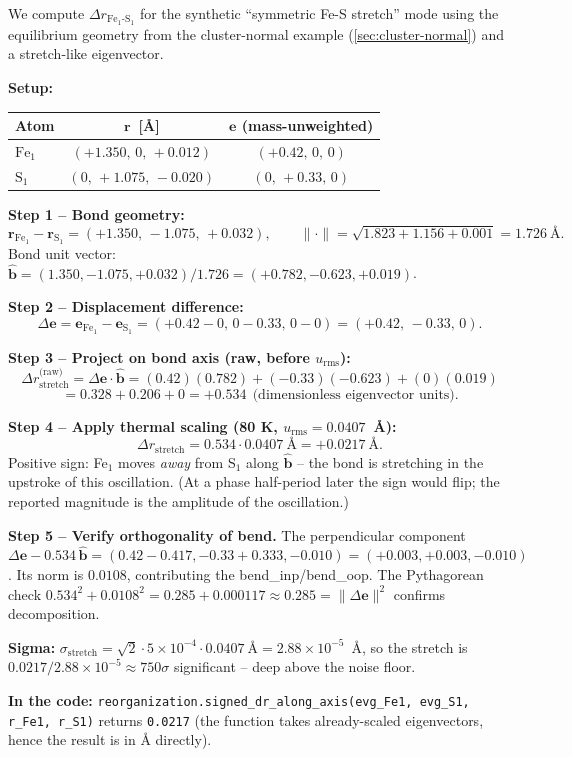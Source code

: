 \documentclass[10pt,a4paper,twoside]{article}
\newcommand{\rvec}{\mathbf{r}}
\newcommand{\evec}{\mathbf{e}}
\newcommand{\bhat}{\hat{\mathbf{b}}}
\newcommand{\urms}{u_{\mathrm{rms}}}
\newcommand{\fn}[1]{\texttt{#1}}
\begin{document}
\begin{workedexample}
We compute $\Delta r_{\text{Fe}_1\text{-}\text{S}_1}$ for the
synthetic ``symmetric Fe-S stretch'' mode using the equilibrium
geometry from the cluster-normal example
(\cref{sec:cluster-normal}) and a stretch-like eigenvector.

\textbf{Setup:}
\begin{center}
\begin{tabular}{lcc}
\toprule
Atom    & $\rvec$~[\AA{}]                  & $\evec$ (mass-unweighted) \\
\midrule
$\text{Fe}_1$ & $(+1.350,\,0,\,+0.012)$ & $(+0.42,\,0,\,0)$ \\
$\text{S}_1$  & $(0,\,+1.075,\,-0.020)$ & $(0,\,+0.33,\,0)$ \\
\bottomrule
\end{tabular}
\end{center}

\textbf{Step 1 -- Bond geometry:}
\[
  \rvec_{\text{Fe}_1} - \rvec_{\text{S}_1}
   = (+1.350,\,-1.075,\,+0.032),
   \qquad
  \lVert\cdot\rVert
   = \sqrt{1.823 + 1.156 + 0.001}
   = 1.726~\text{\AA{}}.
\]
Bond unit vector:
$\bhat = (1.350, -1.075, +0.032)/1.726 = (+0.782, -0.623, +0.019)$.

\textbf{Step 2 -- Displacement difference:}
\[
  \Delta\evec
   = \evec_{\text{Fe}_1} - \evec_{\text{S}_1}
   = (+0.42 - 0,\,0 - 0.33,\,0 - 0)
   = (+0.42,\,-0.33,\,0).
\]

\textbf{Step 3 -- Project on bond axis (raw, before $\urms$):}
\[
  \Delta r_\text{stretch}^\text{(raw)}
   = \Delta\evec \cdot \bhat
   = (0.42)(0.782) + (-0.33)(-0.623) + (0)(0.019)
\]
\[
   = 0.328 + 0.206 + 0
   = +0.534
   ~~\text{(dimensionless eigenvector units)}.
\]

\textbf{Step 4 -- Apply thermal scaling (80 K, $\urms = 0.0407$~\AA{}):}
\[
  \Delta r_\text{stretch}
   = 0.534 \cdot 0.0407~\text{\AA}
   = \boxed{+0.0217~\text{\AA{}}}.
\]
Positive sign: Fe$_1$ moves \emph{away} from S$_1$ along $\bhat$ -- the
bond is stretching in the upstroke of this oscillation. (At a phase
half-period later the sign would flip; the reported magnitude is the
amplitude of the oscillation.)

\textbf{Step 5 -- Verify orthogonality of bend.}
The perpendicular component $\Delta\evec - 0.534\,\bhat
= (0.42 - 0.417, -0.33 + 0.333, -0.010)
= (+0.003, +0.003, -0.010)$.
Its norm is $0.0108$, contributing the bend\_inp/bend\_oop. The
Pythagorean check
$0.534^2 + 0.0108^2 = 0.285 + 0.000117 \approx 0.285
= \lVert\Delta\evec\rVert^2$ confirms decomposition.

\textbf{Sigma:}
$\sigma_\text{stretch} = \sqrt{2} \cdot 5\!\times\!10^{-4} \cdot
0.0407~\text{\AA} = 2.88 \times 10^{-5}$~\AA{}, so the stretch is
$0.0217/2.88\!\times\!10^{-5} \approx 750\sigma$ significant --
deep above the noise floor.

\textbf{In the code:}
\fn{reorganization.signed\_dr\_along\_axis(evg\_Fe1, evg\_S1,
r\_Fe1, r\_S1)} returns \texttt{0.0217} (the function takes
already-scaled eigenvectors, hence the result is in \AA{} directly).
\end{workedexample}
\end{document}
